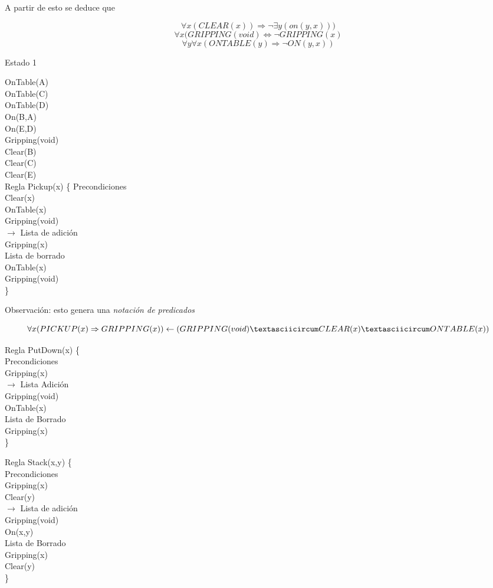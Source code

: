 A partir de esto se deduce que

$$\forall x (CLEAR(x)) \Rightarrow \neg \exists y (on(y,x)))$$
$$\forall x (GRIPPING (void) \Leftrightarrow \neg GRIPPING (x)$$
$$\forall y \forall x (ONTABLE (y) \Rightarrow \neg ON (y , x ))$$


Estado 1

	OnTable(A)\\
	OnTable(C)\\
	OnTable(D)\\
	On(B,A)\\
	On(E,D)\\
	Gripping(void) \\
	Clear(B) \\
	Clear(C) \\ 
	Clear(E)\\ 


Regla Pickup(x) \{
	Precondiciones \\
	Clear(x) \\
	OnTable(x) \\
	Gripping(void) \\
$\rightarrow$
	Lista de adición \\
	Gripping(x) \\ 
	Lista de borrado \\
	OnTable(x) \\
	Gripping(void) \\
\}


Observación: esto genera una \textit{notación de predicados}
 
$$ \forall x (PICKUP (x) \Rightarrow GRIPPING (x)) \leftarrow (GRIPPING (void) \textasciicircum CLEAR (x) \textasciicircum ONTABLE (x))
$$

Regla PutDown(x) \{ \\
	Precondiciones \\
	Gripping(x) \\
	$\rightarrow$
	Lista Adición \\
	Gripping(void) \\
	OnTable(x) \\
	Lista de Borrado \\
	Gripping(x) \\
\}

Regla Stack(x,y) \{ \\
	Precondiciones \\
	Gripping(x) \\
	Clear(y) \\
	$\rightarrow$ 
	Lista de adición \\
	Gripping(void) \\
	On(x,y) \\
	Lista de Borrado \\
	Gripping(x) \\
	Clear(y) \\
\}

